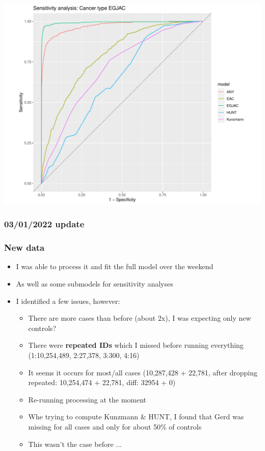 \documentclass[12pt]{article}
\begin{document}
\begin{center}
\includegraphics[width=\textwidth]{sensitivity_cancertype/roc_curves_EGJAC_model.pdf}
\end{center}





\pagebreak
\subsubsection*{03/01/2022 update}


\subsubsection*{New data}
\begin{itemize}
	\item I was able to process it and fit the full model over the weekend
	\item As well as some submodels for sensitivity analyses
	\item I identified a few issues, however:
	\begin{itemize}
		\item There are more cases than before (about 2x), I was expecting only
		new controls? 
		\item There were \textbf{repeated IDs} which I missed before running 
		everything (1:10,254,489, 2:27,378, 3:300, 4:16)
		\item It seems it occurs for most/all cases
		(10,287,428 + 22,781, after dropping repeated: 10,254,474 + 22,781, diff: 32954 + 0)
		\item Re-running processing at the moment
		\item Whe trying to compute Kunzmann \& HUNT, I found that Gerd was missing 
		for all cases and only for about 50\% of controls
		\item This wasn't the case before ...
	\end{itemize}
\end{itemize}
\end{document}
